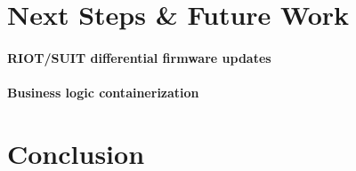 
\section{Next Steps \& Future Work}
\label{sec:futurework}

\paragraph*{RIOT/SUIT differential firmware updates}
\paragraph*{Business logic containerization}

\section{Conclusion}
\label{sec:conclusion}

